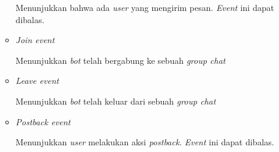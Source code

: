 \begin{enumerate}
\begin{itemize}
Menunjukkan bahwa ada \textit{user} yang mengirim pesan. \textit{Event} ini dapat dibalas.

\item \textit{Join event}

Menunjukkan \textit{bot} telah bergabung ke sebuah \textit{group chat}

\item \textit{Leave event}

Menunjukkan \textit{bot} telah keluar dari sebuah \textit{group chat}

\item \textit{Postback event}

Menunjukkan \textit{user} melakukan aksi \textit{postback}. \textit{Event} ini dapat dibalas.

\end{itemize}

\end{enumerate}

